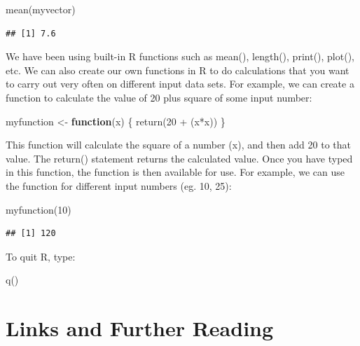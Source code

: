 \documentclass[
]{book}
\newenvironment{Shaded}{\begin{snugshade}}{\end{snugshade}}
\newcommand{\ControlFlowTok}[1]{\textcolor[rgb]{0.13,0.29,0.53}{\textbf{#1}}}
\newcommand{\DecValTok}[1]{\textcolor[rgb]{0.00,0.00,0.81}{#1}}
\newcommand{\FunctionTok}[1]{\textcolor[rgb]{0.00,0.00,0.00}{#1}}
\newcommand{\NormalTok}[1]{#1}
\newcommand{\OtherTok}[1]{\textcolor[rgb]{0.56,0.35,0.01}{#1}}
\newcommand{\SpecialCharTok}[1]{\textcolor[rgb]{0.00,0.00,0.00}{#1}}
\begin{document}
\begin{Shaded}
\begin{Highlighting}[]
\FunctionTok{mean}\NormalTok{(myvector)}
\end{Highlighting}
\end{Shaded}

\begin{verbatim}
## [1] 7.6
\end{verbatim}

We have been using built-in R functions such as mean(), length(), print(), plot(), etc. We can also create our own functions in R to do calculations that you want to carry out very often on different input data sets. For example, we can create a function to calculate the value of 20 plus square of some input number:

\begin{Shaded}
\begin{Highlighting}[]
\NormalTok{myfunction }\OtherTok{\textless{}{-}} \ControlFlowTok{function}\NormalTok{(x) \{ }\FunctionTok{return}\NormalTok{(}\DecValTok{20} \SpecialCharTok{+}\NormalTok{ (x}\SpecialCharTok{*}\NormalTok{x)) \}}
\end{Highlighting}
\end{Shaded}

This function will calculate the square of a number (x), and then add 20 to that value. The return() statement returns the calculated value. Once you have typed in this function, the function is then available for use. For example, we can use the function for different input numbers (eg. 10, 25):

\begin{Shaded}
\begin{Highlighting}[]
\FunctionTok{myfunction}\NormalTok{(}\DecValTok{10}\NormalTok{)}
\end{Highlighting}
\end{Shaded}

\begin{verbatim}
## [1] 120
\end{verbatim}

To quit R, type:

\begin{Shaded}
\begin{Highlighting}[]
\FunctionTok{q}\NormalTok{()}
\end{Highlighting}
\end{Shaded}

\hypertarget{links-and-further-reading}{%
\section{Links and Further Reading}\label{links-and-further-reading}}
\end{document}
